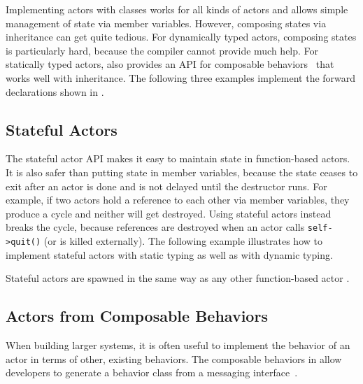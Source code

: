 Implementing actors with classes works for all kinds of actors and allows simple management of state via member variables. However, composing states via inheritance can get quite tedious. For dynamically typed actors, composing states is particularly hard, because the compiler cannot provide much help. For statically typed actors, \lib also provides an API for composable behaviors~ that works well with inheritance. The following three examples implement the forward declarations shown in .



\clearpage
\subsection{Stateful Actors}
\label{stateful-actor}

The stateful actor API makes it easy to maintain state in function-based actors. It is also safer than putting state in member variables, because the state ceases to exit after an actor is done and is not delayed until the destructor runs. For example, if two actors hold a reference to each other via member variables, they produce a cycle and neither will get destroyed. Using stateful actors instead breaks the cycle, because references are destroyed when an actor calls \lstinline^self->quit()^ (or is killed externally). The following example illustrates how to implement stateful actors with static typing as well as with dynamic typing.



Stateful actors are spawned in the same way as any other function-based actor .



\clearpage
\subsection{Actors from Composable Behaviors \experimental}
\label{composable-behavior}

When building larger systems, it is often useful to implement the behavior of an actor in terms of other, existing behaviors. The composable behaviors in \lib allow developers to generate a behavior class from a messaging interface~.

